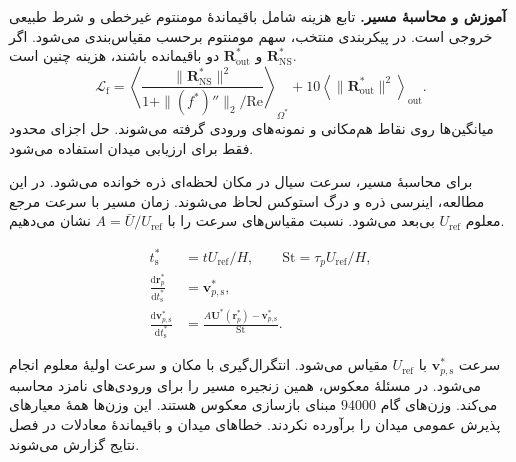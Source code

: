 \textbf{آموزش و محاسبهٔ مسیر.}
تابع هزینه شامل باقیماندهٔ مومنتوم غیرخطی و شرط طبیعی خروجی است.
در پیکربندی منتخب، سهم مومنتوم برحسب  مقیاس‌بندی می‌شود.
اگر $\mathbf R_{\mathrm{NS}}^*$ و $\mathbf R_{\mathrm{out}}^*$ دو باقیمانده باشند، هزینه چنین است.
\begin{equation}
\mathcal L_{\mathrm f}=
\left\langle
\frac{\|\mathbf R_{\mathrm{NS}}^*\|^2}
 {1+\|(f^*)''\|_2/\mathrm{Re}}
\right\rangle_{\Omega^*}
+10\left\langle\|\mathbf R_{\mathrm{out}}^*\|^2\right\rangle_{\mathrm{out}}.
\label{eq:forward-flow-training-loss}
\end{equation}
میانگین‌ها روی نقاط هم‌مکانی و نمونه‌های ورودی گرفته می‌شوند.
حل اجزای محدود فقط برای ارزیابی میدان استفاده می‌شود.

برای محاسبهٔ مسیر، سرعت سیال در مکان لحظه‌ای ذره خوانده می‌شود.
در این مطالعه، اینرسی ذره و درگ استوکس لحاظ می‌شوند.
زمان مسیر با سرعت مرجع معلوم $U_{\mathrm{ref}}$ بی‌بعد می‌شود.
نسبت مقیاس‌های سرعت را با $A=\bar U/U_{\mathrm{ref}}$ نشان می‌دهیم.

\begin{equation}
\begin{aligned}
t_{\mathrm s}^*&=t U_{\mathrm{ref}}/H,\qquad
\mathrm{St}=\tau_p U_{\mathrm{ref}}/H,\\
\frac{\mathrm d\mathbf r_p^*}{\mathrm dt_{\mathrm s}^*}
&=\mathbf v_{p,\mathrm s}^*,\\
\frac{\mathrm d\mathbf v_{p,\mathrm s}^*}{\mathrm dt_{\mathrm s}^*}
&=\frac{A\mathbf U^*(\mathbf r_p^*)-\mathbf v_{p,\mathrm s}^*}{\mathrm{St}}.
\end{aligned}
\label{eq:forward-flow-stokes-path}
\end{equation}

سرعت $\mathbf v_{p,\mathrm s}^*$ با $U_{\mathrm{ref}}$ مقیاس می‌شود.
انتگرال‌گیری با مکان و سرعت اولیهٔ معلوم انجام می‌شود.
در مسئلهٔ معکوس، همین زنجیره مسیر را برای ورودی‌های نامزد محاسبه می‌کند.
وزن‌های گام $94000$ مبنای بازسازی معکوس هستند.
این وزن‌ها همهٔ معیارهای پذیرش عمومی میدان را برآورده نکردند.
خطاهای میدان و باقیماندهٔ معادلات در فصل نتایج گزارش می‌شوند.

